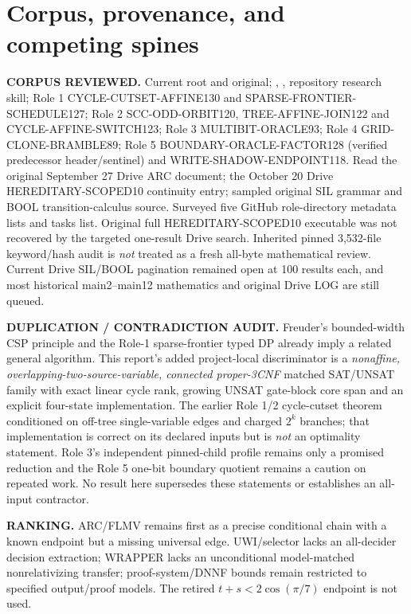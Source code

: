 \documentclass[11pt]{article}
\begin{document}
\section{Corpus, provenance, and competing spines}
\textbf{CORPUS REVIEWED.} Current root  and  original; , , repository research skill; Role 1 CYCLE-CUTSET-AFFINE130 and SPARSE-FRONTIER-SCHEDULE127; Role 2 SCC-ODD-ORBIT120, TREE-AFFINE-JOIN122 and CYCLE-AFFINE-SWITCH123; Role 3 MULTIBIT-ORACLE93; Role 4 GRID-CLONE-BRAMBLE89; Role 5 BOUNDARY-ORACLE-FACTOR128 (verified predecessor header/sentinel) and WRITE-SHADOW-ENDPOINT118. Read the original September 27 Drive ARC document; the October 20 Drive HEREDITARY-SCOPED10 continuity entry; sampled original SIL grammar and BOOL transition-calculus source. Surveyed five GitHub role-directory metadata lists and tasks list. Original full HEREDITARY-SCOPED10 executable was not recovered by the targeted one-result Drive search. Inherited pinned 3,532-file keyword/hash audit is \emph{not} treated as a fresh all-byte mathematical review. Current Drive SIL/BOOL pagination remained open at 100 results each, and most historical main2--main12 mathematics and original Drive LOG are still queued.

\textbf{DUPLICATION / CONTRADICTION AUDIT.} Freuder's bounded-width CSP principle and the Role-1 sparse-frontier typed DP already imply a related general algorithm. This report's added project-local discriminator is a \emph{nonaffine, overlapping-two-source-variable, connected proper-3CNF} matched SAT/UNSAT family with exact linear cycle rank, growing UNSAT gate-block core span and an explicit four-state implementation. The earlier Role 1/2 cycle-cutset theorem conditioned on off-tree single-variable edges and charged $2^k$ branches; that implementation is correct on its declared inputs but is \emph{not} an optimality statement. Role 3's independent pinned-child profile remains only a promised reduction and the Role 5 one-bit boundary quotient remains a caution on repeated work. No result here supersedes these statements or establishes an all-input contractor.

\textbf{RANKING.} ARC/FLMV remains first as a precise conditional chain with a known endpoint but a missing universal edge. UWI/selector lacks an all-decider decision extraction; WRAPPER lacks an unconditional model-matched nonrelativizing transfer; proof-system/DNNF bounds remain restricted to specified output/proof models. The retired $t+s<2\cos(\pi/7)$ endpoint is not used.
\end{document}
